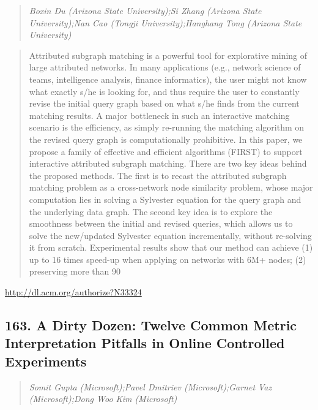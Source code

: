 \documentclass{article}
\begin{document}
\begin{quote}
\footnotesize{\textit{Boxin Du (Arizona State University);Si Zhang (Arizona State University);Nan Cao (Tongji University);Hanghang Tong (Arizona State University)}}

\end{quote}

\begin{quote}
Attributed subgraph matching is a powerful tool for explorative mining of large attributed networks. In many applications (e.g., network science of teams, intelligence analysis, finance informatics), the user might not know what exactly s/he is looking for, and thus require the user to constantly revise the initial query graph based on what s/he finds from the current matching results. A major bottleneck in such an interactive matching scenario is the efficiency, as simply re-running the matching algorithm on the revised query graph is computationally prohibitive. In this paper, we propose a family of effective and efficient algorithms (FIRST) to support interactive attributed subgraph matching. There are two key ideas behind the proposed methods. The first is to recast the attributed subgraph matching problem as a cross-network node similarity problem, whose major computation lies in solving a Sylvester equation for the query graph and the underlying data graph. The second key idea is to explore the smoothness between the initial and revised queries, which allows us to solve the new/updated Sylvester equation incrementally, without re-solving it from scratch. Experimental results show that our method can achieve (1) up to 16 times speed-up when applying on networks with 6M+ nodes; (2) preserving more than 90%
\end{quote}

\href{http://dl.acm.org/authorize?N33324}{http://dl.acm.org/authorize?N33324}

\subsection{163. A Dirty Dozen: Twelve Common Metric Interpretation Pitfalls in Online Controlled Experiments}

\begin{quote}
\footnotesize{\textit{Somit Gupta (Microsoft);Pavel Dmitriev (Microsoft);Garnet Vaz (Microsoft);Dong Woo Kim (Microsoft)}}

\end{quote}
\end{document}
